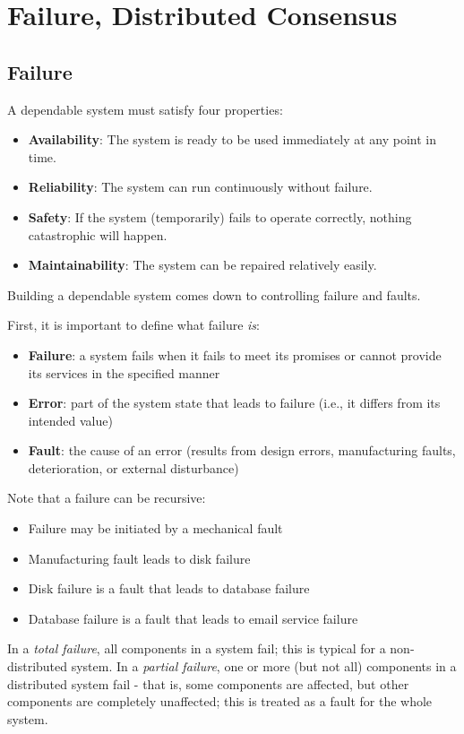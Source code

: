 \chapter{Failure, Distributed Consensus}
\section{Failure}
A dependable system must satisfy four properties: \begin{itemize}
\item \textbf{Availability}: The system is ready to be used immediately at any point in time.
\item \textbf{Reliability}: The system can run continuously without failure.
\item \textbf{Safety}: If the system (temporarily) fails to operate correctly, nothing catastrophic will happen.
\item \textbf{Maintainability}: The system can be repaired relatively easily.
\end{itemize}
Building a dependable system comes down to controlling failure and faults. 

First, it is important to define what failure \textit{is}: \begin{itemize}
\item \textbf{Failure}: a system fails when it fails to meet its promises or cannot provide its services in the specified manner
\item \textbf{Error}: part of the system state that leads to failure (i.e., it differs from its intended value)
\item \textbf{Fault}: the cause of an error (results from design errors, manufacturing faults, deterioration, or external disturbance)
\end{itemize}
Note that a failure can be recursive: \begin{itemize}
\item Failure may be initiated by a mechanical fault 
\item Manufacturing fault leads to disk failure 
\item Disk failure is a fault that leads to database failure 
\item Database failure is a fault that leads to email service failure 
\end{itemize}

In a \textit{total failure}, all components in a system fail; this is typical for a non-distributed system. In a \textit{partial failure}, one or more (but not all) components in a distributed system fail - that is, some components are affected, but other components are completely unaffected; this is treated as a fault for the whole system.

